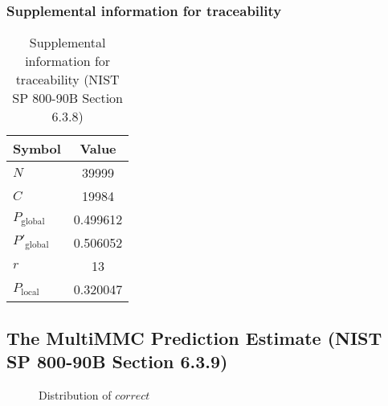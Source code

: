 \documentclass[a3paper,xelatex,english]{bxjsarticle}
\begin{document}
\subsubsection{Supplemental information for traceability}
\renewcommand{\arraystretch}{1.8}
\begin{table}[h]
\caption{Supplemental information for traceability (NIST SP 800-90B Section 6.3.8)}
\begin{center}
\begin{tabular}{|l|c|}
\hline 
\rowcolor{anotherlightblue} %
Symbol				& Value \\ \hline 
$N$				& 39999\\ \hline 
$C$				& 19984\\ \hline 
$P_{\textrm{global}}$				& 0.499612\\ \hline 
$P'_{\textrm{global}}$			& 0.506052\\ \hline 
$r$				& 13\\ \hline 
$P_{\textrm{local}}$ 			& 0.320047\\ \hline
\end{tabular}
\end{center}
\end{table}
\renewcommand{\arraystretch}{1.4}
\clearpage
\subsection{The MultiMMC Prediction Estimate (NIST SP 800-90B Section 6.3.9)}
\begin{figure}[htbp]
\caption{Distribution of $correct$}
\end{figure}
\end{document}
